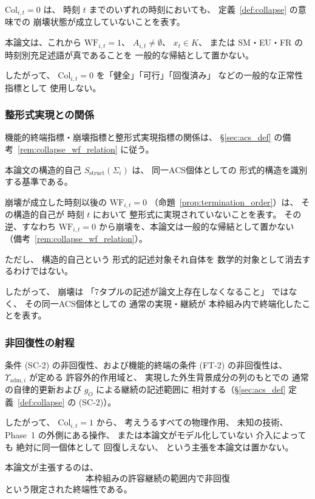 \begin{remark}
\label{rem:collapse_zero_meaning}
$\mathrm{Col}_{i,t}=0$
は、
時刻 $t$ までのいずれの時刻においても、
定義~\ref{def:collapse} の意味での
崩壊状態が成立していないことを表す。

本論文は、これから
$\mathrm{WF}_{i,t}=1$、
$A_{i,t}\neq\emptyset$、
$x_t\in K$、
または
SM・EU・FR の時刻別充足述語が真であることを
一般的な帰結として置かない。

したがって、
$\mathrm{Col}_{i,t}=0$
を「健全」「可行」「回復済み」
などの一般的な正常性指標として
使用しない。
\end{remark}

\subsubsection{整形式実現との関係}

\begin{remark}[整形式実現の不成立と崩壊の関係]
\label{rem:wf_failure_not_collapse}
機能的終端指標・崩壊指標と整形式実現指標の関係は、
\S\ref{sec:acs_def} の備考~\ref{rem:collapse_wf_relation} に従う。
\end{remark}

\begin{remark}[崩壊と構造的自己]
\label{rem:collapse_structural_self}
本論文の構造的自己
$S_{\mathrm{struct}}(\Sigma_i)$
は、
同一ACS個体としての
形式的構造を識別する基準である。

崩壊が成立した時刻以後の
$\mathrm{WF}_{i,t}=0$
（命題~\ref{prop:termination_order}）は、
その構造的自己が
時刻 $t$ において
整形式に実現されていないことを表す。
その逆、すなわち $\mathrm{WF}_{i,t}=0$ から崩壊を、本論文は一般的な帰結として置かない
（備考~\ref{rem:collapse_wf_relation}）。

ただし、
構造的自己という
形式的記述対象それ自体を
数学的対象として消去するわけではない。

したがって、
崩壊は
「7タプルの記述が論文上存在しなくなること」
ではなく、
その同一ACS個体としての
通常の実現・継続が
本枠組み内で終端化したことを表す。
\end{remark}

\subsubsection{非回復性の射程}

\begin{remark}[崩壊の非回復性は本枠組みに相対する]
\label{rem:collapse_relative_irrecoverability}
条件 (SC-2) の非回復性、および機能的終端の条件 (FT-2) の非回復性は、
$\Upsilon_{\mathrm{adm},i}$
が定める
許容外的作用域と、
実現した外生背景成分の列のもとでの
通常の自律的更新および $g_O$ による継続の記述範囲に
相対する（\S\ref{sec:acs_def} 定義~\ref{def:collapse} の (SC-2)）。

したがって、
$\mathrm{Col}_{i,t}=1$
から、
考えうるすべての物理作用、
未知の技術、
Phase~1 の外側にある操作、
または本論文がモデル化していない
介入によっても
絶対に同一個体として
回復しえない、
という主張を本論文は置かない。

本論文が主張するのは、
\[
  \text{本枠組みの許容継続の範囲内で非回復}
\]
という限定された終端性である。
\end{remark}

